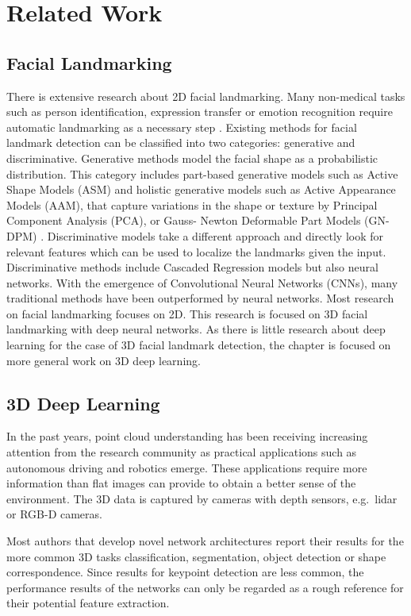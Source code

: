 \documentclass[class=article, crop=false]{standalone}
\begin{document}
\section{Related Work}
\label{sec:works}
\subsection{Facial Landmarking}
There is extensive research about 2D facial landmarking. Many non-medical tasks such as person identification, expression transfer or emotion recognition require automatic landmarking as a necessary step \cite{perrot:hal-02884592}. Existing methods for facial landmark detection can be classified into two categories: generative and discriminative. Generative methods model the facial shape as a probabilistic distribution. This category includes part-based generative models such as Active Shape Models (ASM) and holistic generative models such as Active Appearance Models (AAM), that capture variations in the shape or texture by Principal Component Analysis (PCA), or Gauss- Newton Deformable Part Models (GN-DPM) \cite{yan:hal-02892002}. Discriminative models take a different approach and directly look for relevant features which can be used to localize the landmarks given the input. Discriminative methods include Cascaded Regression models but also neural networks. With the emergence of Convolutional Neural Networks (CNNs), many traditional methods have been outperformed by neural networks. Most research on facial landmarking focuses on 2D. This research is focused on 3D facial landmarking with deep neural networks. As there is little research about deep learning for the case of 3D facial landmark detection, the chapter is focused on more general work on 3D deep learning.

\subsection{3D Deep Learning}
In the past years, point cloud understanding has been receiving increasing attention from the research community as practical applications such as autonomous driving and robotics emerge. These applications require more information than flat images can provide to obtain a better sense of the environment. The 3D data is captured by cameras with depth sensors, e.g.\, lidar or RGB-D cameras. 

Most authors that develop novel network architectures report their results for the more common 3D tasks classification, segmentation, object detection or shape correspondence. Since results for keypoint detection are less common, the performance results of the networks can only be regarded as a rough reference for their potential feature extraction.
\end{document}
